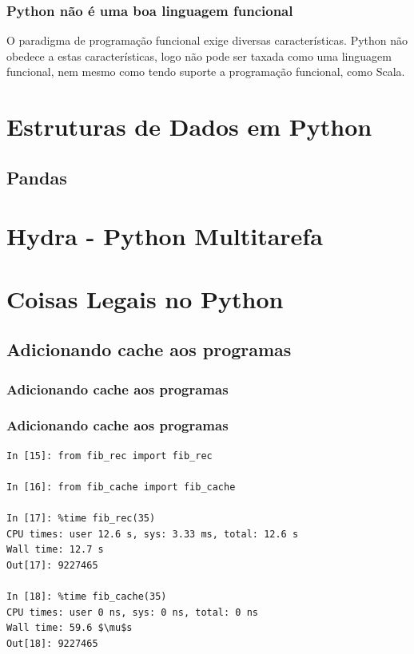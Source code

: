 \documentclass[aspectratio=169]{beamer}
\begin{document}
\begin{frame}
    \frametitle{Python não é uma boa linguagem funcional}
    O paradigma de programação funcional exige diversas características. Python não
obedece a estas características, logo não pode ser taxada como uma linguagem funcional,
nem mesmo como tendo suporte a programação funcional, como Scala.
\end{frame}


\section{Estruturas de Dados em Python}

\subsection{Pandas}



\section{Hydra - Python Multitarefa}



\section{Coisas Legais no Python}

\subsection{Adicionando cache aos programas}

\begin{frame}[fragile]
	\frametitle{Adicionando cache aos programas}
	\noindent\begin{minipage}{.5\textwidth}
		
		\end{minipage}\hfill
		\begin{minipage}{.45\textwidth}
		
	\end{minipage}
\end{frame}

\begin{frame}[fragile]
	\frametitle{Adicionando cache aos programas}
	\begin{lstlisting}[mathescape=true]
In [15]: from fib_rec import fib_rec

In [16]: from fib_cache import fib_cache

In [17]: %time fib_rec(35)
CPU times: user 12.6 s, sys: 3.33 ms, total: 12.6 s
Wall time: 12.7 s
Out[17]: 9227465

In [18]: %time fib_cache(35)
CPU times: user 0 ns, sys: 0 ns, total: 0 ns
Wall time: 59.6 $\mu$s
Out[18]: 9227465
	\end{lstlisting}
\end{frame}
\end{document}

